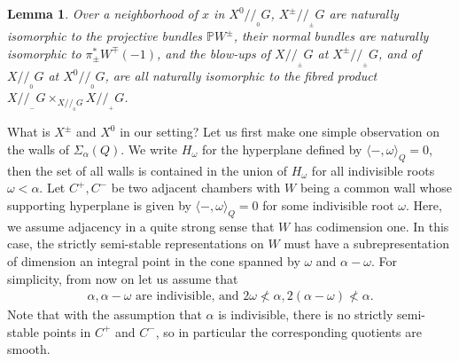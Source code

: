 \documentclass{amsart}
\newtheorem{lemma}[theorem]{Lemma}
\theoremstyle{definition}
\theoremstyle{remark}
\numberwithin{equation}{section}
\begin{document}
\begin{lemma} \cite[Theorem 4.8]{T} \label{L:VGIT} Over a neighborhood of $x$ in $X^0{/\!\!/_{\!\!_{0}}}G$, $X^{\pm}{/\!\!/_{\!\!_{\pm}}}G$ are naturally isomorphic to the projective bundles ${\mathbb{{P}}}W^{\pm}$, their normal bundles are naturally isomorphic to $\pi_{\pm}^* W^{\mp}(-1)$, and the blow-ups of $X{/\!\!/_{\!\!_{\pm}}}G$ at $X^{\pm}{/\!\!/_{\!\!_{\pm}}}G$, and of $X{/\!\!/_{\!\!_{0}}}G$ at $X^0{/\!\!/_{\!\!_{0}}}G$, are all naturally isomorphic to the fibred product $X{/\!\!/_{\!\!_{-}}}G\times_{X{/\!\!/_{\!\!_{0}}}G}X{/\!\!/_{\!\!_{+}}}G$.
\end{lemma}

What is $X^{\pm}$ and $X^0$ in our setting? Let us first make one simple observation on the walls of $\Sigma_\alpha(Q)$. We write $H_\omega$ for the hyperplane defined by ${\langle{-,\omega}\rangle}_Q=0$, then the set of all walls is contained in the union of $H_\omega$ for all indivisible roots $\omega<\alpha$. Let $C^+,C^-$ be two adjacent chambers with $W$ being a common wall whose supporting hyperplane is given by ${\langle{-,\omega}\rangle}_Q=0$ for some indivisible root $\omega$. Here, we assume adjacency in a quite strong sense that $W$ has codimension one. In this case, the strictly semi-stable representations on $W$ must have a subrepresentation of dimension an integral point in the cone spanned by $\omega$ and $\alpha-\omega$. For simplicity, from now on let us assume that \begin{align*}
\alpha,\alpha-\omega \text{ are indivisible, and } 2\omega\nless\alpha,2(\alpha-\omega)\nless\alpha. \tag{$\smiley$}
\end{align*}
Note that with the assumption that $\alpha$ is indivisible, there is no strictly semi-stable points in $C^+$ and $C^-$, so in particular the corresponding quotients are smooth.
\end{document}
